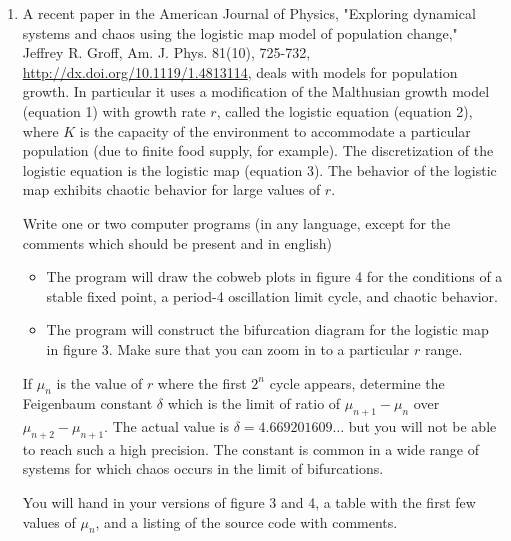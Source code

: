 \documentclass[letterpaper,11pt]{article}
\begin{document}
 
\begin{enumerate}[resume]
 \item A recent paper in the American Journal of Physics, "Exploring dynamical systems and chaos using the logistic map model of population change," Jeffrey R. Groff, Am. J. Phys. 81(10), 725-732, \url{http://dx.doi.org/10.1119/1.4813114}, deals with models for population growth.  In particular it uses a modification of the Malthusian growth model (equation 1) with growth rate $r$, called the logistic equation (equation 2), where $K$ is the capacity of the environment to accommodate a particular population (due to finite food supply, for example).  The discretization of the logistic equation is the logistic map (equation 3).  The behavior of the logistic map exhibits chaotic behavior for large values of $r$.
 
 Write one or two computer programs (in any language, except for the comments which should be present and in english)

 \begin{itemize}
  \item The program will draw the cobweb plots in figure 4 for the conditions of a stable fixed point, a period-4 oscillation limit cycle, and chaotic behavior. 
  \item The program will construct the bifurcation diagram for the logistic map in figure 3.  Make sure that you can zoom in to a particular $r$ range.
 \end{itemize}
 
 If $\mu_n$ is the value of $r$ where the first $2^n$ cycle appears, determine the Feigenbaum constant $\delta$ which is the limit of ratio of $\mu_{n+1}-\mu_n$ over $\mu_{n+2}-\mu_{n+1}$.  The actual value is $\delta = 4.669201609\ldots$ but you will not be able to reach such a high precision.  The constant is common in a wide range of systems for which chaos occurs in the limit of bifurcations.
 
 You will hand in your versions of figure 3 and 4, a table with the first few values of $\mu_n$, and a listing of the source code with comments.
\end{enumerate}
\end{document}
